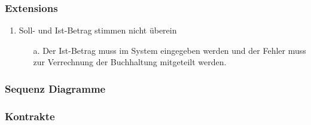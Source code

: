 \documentclass[./detailed_overview_usecases.tex]{subfiles}
\begin{document}
    \subsubsection*{Extensions}
    \begin{enumerate}
        \item Soll- und Ist-Betrag stimmen nicht überein
        \begin{itemize}
            \item[a.] Der Ist-Betrag muss im System eingegeben werden und der Fehler
            muss zur Verrechnung der Buchhaltung mitgeteilt werden.
        \end{itemize}
    \end{enumerate}

    \subsubsection{Sequenz Diagramme}
    \subsubsection{Kontrakte}
\end{document}
